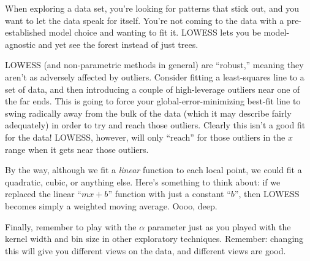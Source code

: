 \begin{compactitem}

\item When exploring a data set, you're looking for patterns that stick out,
and you want to let the data speak for itself. You're not coming to the data
with a pre-established model choice and wanting to fit it. LOWESS lets you be
model-agnostic and yet see the forest instead of just trees.

\item LOWESS (and non-parametric methods in general) are ``robust,'' meaning
they aren't as adversely affected by outliers. Consider fitting a
least-squares line to a set of data, and then introducing a couple of
high-leverage outliers near one of the far ends. This is going to force your
global-error-minimizing best-fit line to swing radically away from the bulk of
the data (which it may describe fairly adequately) in order to try and reach
those outliers. Clearly this isn't a good fit for the data! LOWESS, however,
will only ``reach'' for those outliers in the $x$ range when it gets near those
outliers.

\end{compactitem}

\vspace{.1in}

By the way, although we fit a \textit{linear} function to each local point, we
could fit a quadratic, cubic, or anything else. Here's something to think
about: if we replaced the linear ``$mx+b$'' function with just a constant
``$b$'', then LOWESS becomes simply a weighted moving average. Oooo, deep.

\vspace{.1in}

Finally, remember to play with the $\alpha$ parameter just as you played with
the kernel width and bin size in other exploratory techniques. Remember:
changing this will give you different views on the data, and different views
are good.


